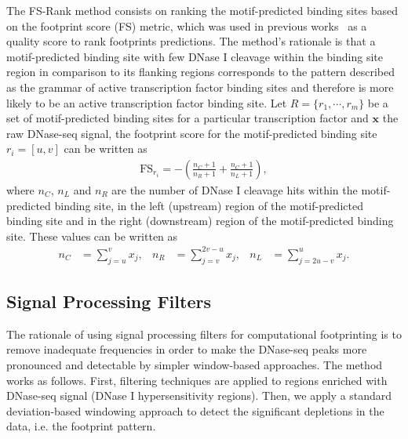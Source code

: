 The FS-Rank method consists on ranking the motif-predicted binding sites based on the footprint score (FS) metric, which was used in previous works~\cite{neph2012a,he2014} as a quality score to rank footprints predictions. The method's rationale is that a motif-predicted binding site with few DNase I cleavage within the binding site region in comparison to its flanking regions corresponds to the pattern described as the grammar of active transcription factor binding sites and therefore is more likely to be an active transcription factor binding site. Let $R = \{ {r}_{1}, \cdots, {r}_{m} \}$ be a set of motif-predicted binding sites for a particular transcription factor and $\mathbf{x}$ the raw DNase-seq signal, the footprint score for the motif-predicted binding site ${r}_{i} = [u,v]$ can be written as
\begin{align}
\text{FS}_{{r}_{i}} = -\left(\frac{{n}_{C}+1}{{n}_{R}+1} + \frac{{n}_{C}+1}{{n}_{L}+1}\right),
\label{eq:fs1}
\end{align}
where ${n}_{C}$, ${n}_{L}$ and ${n}_{R}$ are the number of DNase I cleavage hits within the motif-predicted binding site, in the left (upstream) region of the motif-predicted binding site and in the right (downstream) region of the motif-predicted binding site. These values can be written as
\begin{align}
{n}_{C} &= \sum_{j=u}^{v} {x}_{j}, &
{n}_{R} &= \sum_{j=v}^{2v-u} {x}_{j}, &
{n}_{L} &= \sum_{j=2u-v}^{u} {x}_{j}.
\label{eq:fs2}
\end{align}

\subsection{Signal Processing Filters}
\label{sec:signal.processing.filters}

The rationale of using signal processing filters for computational footprinting is to remove inadequate frequencies in order to make the DNase-seq peaks more pronounced and detectable by simpler window-based approaches. The method works as follows. First, filtering techniques are applied to regions enriched with DNase-seq signal (DNase I hypersensitivity regions). Then, we apply a standard deviation-based windowing approach to detect the significant depletions in the data, i.e. the footprint pattern.

